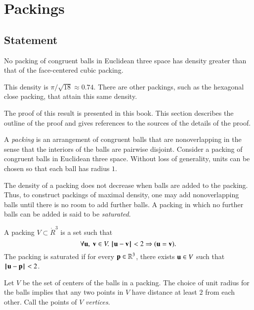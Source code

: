 



\chapter{Packings}


\section{Statement}



\begin{theorem}
\label{theorem:kepler}   No packing of congruent balls in
Euclidean three space has density greater than that of the
face-centered cubic packing.
\end{theorem}

\begin{remark}
This density is $\pi/\sqrt{18}\approx 0.74.$  There are other
packings, such as the hexagonal close packing, that attain this
same density.
\end{remark}

The proof of this result is presented in this book. This section
describes the outline of the proof and gives references to
the sources of the details of the proof.

A {\it packing} is an arrangement of congruent balls that
are nonoverlapping in the sense that the interiors of the balls are
pairwise disjoint. Consider a 
packing of congruent
balls in Euclidean three space. Without loss of generality, units can be chosen so that each ball has radius $1$.

The density of a packing does not
decrease when balls are added to the packing. Thus, to construct
packings of maximal density, one may add
nonoverlapping balls until there is no room to add further balls.
A packing in which no further balls can be added is said to be {\it saturated}.

\begin{definition}
A packing $ V\subset \ring{R}^3$ is a set such that
$$\forall  {\mathbf u},~{\mathbf v}\in  V.~  {\hskip0.1em|\hskip-0.15em|\hskip0.1em} {\mathbf u} - {\mathbf v}{\hskip0.1em|\hskip-0.15em|\hskip0.1em} < 2 \Rightarrow ( {\mathbf u}={\mathbf v}).$$
The packing is saturated if for every ${\mathbf p}\in\mathbb{R}^3$,   there exists $ {\mathbf u}\in V$
such that ${\hskip0.1em|\hskip-0.15em|\hskip0.1em} {\mathbf u} - {\mathbf p}{\hskip0.1em|\hskip-0.15em|\hskip0.1em}< 2$.
\end{definition}
%


Let $ V$ be the set of centers of the balls in a
packing. The choice of unit radius for the
balls implies that any two points in $ V$ have distance at
least $2$ from each other. Call the points of $ V$ {\it
 vertices}.
%
%

